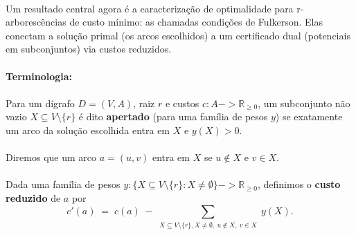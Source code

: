 \documentclass[12pt,a4paper]{article}
\def\\{}%
\def\emph#1{#1}%
\def\to{->}%
\begin{document}
\paragraph{}
Um resultado central agora é a caracterização de \emph{optimalidade} para r-arborescências de custo mínimo: as chamadas \emph{condições de Fulkerson}. Elas conectam a solução primal (os arcos escolhidos) a um certificado dual (potenciais em subconjuntos) via custos reduzidos.

\paragraph{Terminologia:} 
\paragraph{}
Para um dígrafo $D=(V,A)$, raiz $r$ e custos $c:A\to \mathbb{R}_{\ge 0}$, um subconjunto não vazio $X\subseteq V\setminus\{r\}$ é dito \textbf{apertado} (para uma família de pesos $y$) se exatamente um arco da solução escolhida entra em $X$ e $y(X)>0$. 

\paragraph{}
Diremos que um arco $a=(u,v)$ \emph{entra} em $X$ se $u\notin X$ e $v\in X$. 

\paragraph{}
Dada uma família de pesos $y: \{X\subseteq V\setminus\{r\}: X\neq\emptyset\}\to \mathbb{R}_{\ge 0}$, definimos o \textbf{custo reduzido} de $a$ por
\[
 c'(a) \;=\; c(a)\; - \sum_{\substack{X\subseteq V\setminus\{r\},\\ X\neq\emptyset,\ u\notin X,\ v\in X}} y(X).
\]
\end{document}
